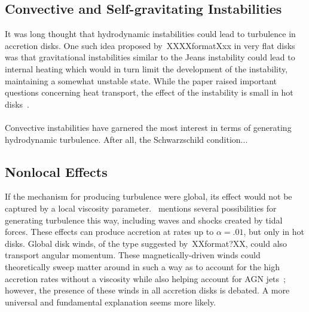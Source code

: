 \subsection{Convective and Self-gravitating Instabilities}
It was long thought that hydrodynamic instabilities could lead to turbulence in accretion disks. One such idea proposed by~\cite{Paczynski1978}XXXXformatXxx in very flat disks was that gravitational instabilities similar to the Jeans instability could lead to internal heating which would in turn limit the development of the instability, maintaining a somewhat unstable state. While the paper raised important questions concerning heat transport, the effect of the instability is small in hot disks~\cite{Spruit2009}.\\
\\
Convective instabilities have garnered the most interest in terms of generating hydrodynamic turbulence. After all, the Schwarzschild condition...

\subsection{Nonlocal Effects}
If the mechanism for producing turbulence were global, its effect would not be captured by a local viscosity parameter.~\cite{Spruit2009} mentions several possibilities for generating turbulence this way, including waves and shocks created by tidal forces. These effects can produce accretion at rates up to $\alpha=.01$, but only in hot disks. Global disk winds, of the type suggested by~\cite{Blandford1976}XXformat?XX, could also transport angular momentum. These magnetically-driven winds could theoretically sweep matter around in such a way as to account for the high accretion rates without a viscosity while also helping account for AGN jets~\cite{Koenigl1989}; however, the presence of these winds in all accretion disks is debated. A more universal and fundamental explanation seems more likely.

